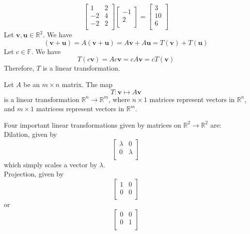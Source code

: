 \begin{solution}
    \[
        \begin{bmatrix}
            1 &2   \\
            -2 &4   \\
             -2&2   \\
        \end{bmatrix} \begin{bmatrix}
             -1 \\
              2\\
        \end{bmatrix}=\begin{bmatrix}
             3 \\
             10 \\
              6\\
        \end{bmatrix}
    \]
    Let \(\mathbf{v} ,\mathbf{u} \in \mathbb{R} ^2\). We have 
    \[
        (\mathbf{v} +\mathbf{u} )=A(\mathbf{v} +\mathbf{u} )=A \mathbf{v} +A \mathbf{u} =T(\mathbf{v} )+T(\mathbf{u} )
    \]
    Let \(c\in\mathbb{F} \). We have
    \[
        T(c \mathbf{v} )=Ac \mathbf{v} =cA \mathbf{v} =cT(\mathbf{v} )
    \]
    Therefore, \(T\) is a linear transformation.
\end{solution}
\begin{theorem}
    Let \(A\) be an \(m\times n\) matrix. The map 
    \[
        T: \mathbf{v} \mapsto A \mathbf{v} 
    \]
    is a linear transformation \(\mathbb{R} ^n \to \mathbb{R} ^m\), where \(n\times 1\) matrices represent vectors in \(\mathbb{R} ^n\), and \(m\times 1\) matricess represent vectors in \(\mathbb{R} ^m\).
\end{theorem}
Four important linear transformations given by matrices on \(\mathbb{R} ^2\to \mathbb{R} ^2\) are:\\
Dilation, given by
\[
    \begin{bmatrix}
        \lambda  &0   \\
         0&   \lambda \\
    \end{bmatrix}
\]
which simply scales a vector by \(\lambda \).\\
Projection, given by 
\[
    \begin{bmatrix}
        1 &0   \\
         0&0   \\
    \end{bmatrix}
\]
or
\[
    \begin{bmatrix}
        0 &0   \\
         0&  1 \\
    \end{bmatrix}
\]
